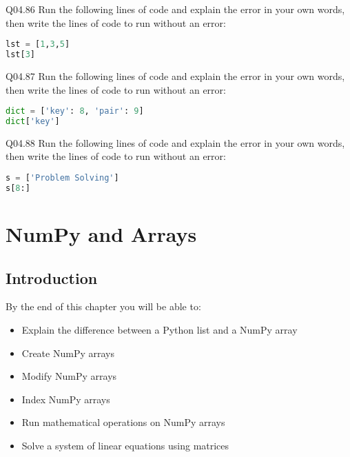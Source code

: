 \documentclass{book}
\newenvironment{problems}{}{}  %
\begin{document}
\begin{problems}
Q04.86 Run the following lines of code and explain the error in your own
words, then write the lines of code to run without an error:

\begin{lstlisting}[language=Python]
lst = [1,3,5]
lst[3]
\end{lstlisting}

Q04.87 Run the following lines of code and explain the error in your own
words, then write the lines of code to run without an error:

\begin{lstlisting}[language=Python]
dict = ['key': 8, 'pair': 9]
dict['key']
\end{lstlisting}

Q04.88 Run the following lines of code and explain the error in your own
words, then write the lines of code to run without an error:

\begin{lstlisting}[language=Python]
s = ['Problem Solving']
s[8:]
\end{lstlisting}
        \end{problems}

    




    
        \hypertarget{numpy-and-arrays}{%
\chapter{NumPy and Arrays}\label{numpy-and-arrays}}
    




    
        \hypertarget{introduction}{%
\section{Introduction}\label{introduction}}
    




    
        By the end of this chapter you will be able to:

\begin{itemize}
\item
  Explain the difference between a Python list and a NumPy array
\item
  Create NumPy arrays
\item
  Modify NumPy arrays
\item
  Index NumPy arrays
\item
  Run mathematical operations on NumPy arrays
\item
  Solve a system of linear equations using matrices
\end{itemize}
        \newpage
\end{document}
